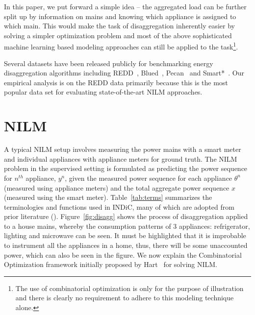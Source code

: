 \documentclass[conference]{IEEEtran}
\newcommand{\figref}[1]{Figure~\ref{#1}}
\newcommand{\tabref}[1]{Table~\ref{#1}}
\newcommand{\indicns}{INDiC}
\begin{document}
\noindent In this paper, we put forward a simple idea -- the aggregated load can be further split up by information on mains and knowing which appliance is assigned to which main. This would make the task of disaggregation inherently easier by solving a simpler optimization problem and most of the above sophisticated machine learning based modeling approaches can still be applied to the task\footnote{The use of combinatorial optimization is only for the purpose of illustration and there is clearly no requirement to adhere to this modeling technique alone.}. 

\noindent Several datasets have been released publicly for benchmarking energy disaggregation algorithms including REDD~\cite{redd}, Blued~\cite{blued_cmu}, Pecan~\cite{pecan} and Smart*~\cite{smart}. Our empirical analysis is on the REDD data primarily because this is the most popular data set for evaluating state-of-the-art NILM approaches. 

\vspace{-2mm}
\section{NILM}
\vspace{-1mm}
\noindent A typical NILM setup involves measuring the power mains with a smart meter and individual appliances with appliance meters for ground truth. The NILM problem in the supervised setting is formulated as predicting the power sequence for $n^{th}$ appliance, $y^n$, given the measured power sequence for each appliance $\theta^n$ (measured using appliance meters) and the total aggregate power sequence $x$ (measured using the smart meter). \tabref{tab:terms} summarizes the terminologies and functions used in \indicns, many of which are adopted from prior literature (\cite{redd,parson2012_aaai,hart}). \figref{fig:disagg} shows the process of disaggregation applied to a house mains, whereby the consumption patterns of 3 appliances: refrigerator, lighting and microwave can be seen. It must be highlighted that it is improbable to instrument all the appliances in a home, thus, there will be some unaccounted power, which can also be seen in the figure. We now explain the Combinatorial Optimization framework initially proposed by Hart~\cite{hart} for solving NILM.
\end{document}
